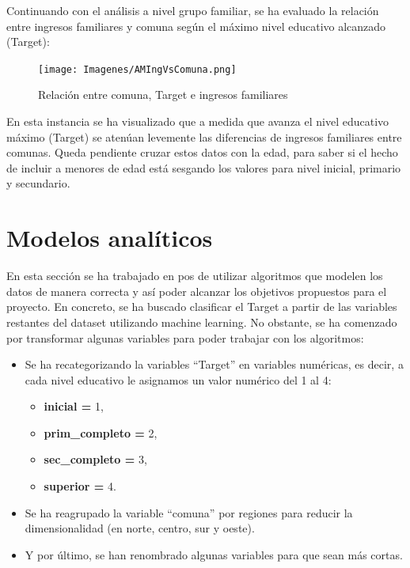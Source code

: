 \documentclass[a4paper]{article}
\begin{document}
        \newpage

        Continuando con el análisis a nivel grupo familiar, se ha evaluado la relación entre ingresos familiares y comuna según el máximo nivel educativo alcanzado (Target):
        \begin{figure}[H]
            \centering
            \texttt{[image: Imagenes/AMIngVsComuna.png]}
            \caption{Relación entre comuna, Target e ingresos familiares}
            \label{AM Location, Taget and Familiar Income}
        \end{figure}
 
        En esta instancia se ha visualizado que a medida que avanza el nivel educativo máximo (Target) se atenúan levemente las diferencias de ingresos familiares entre comunas. Queda pendiente cruzar estos datos con la edad, para saber si el hecho de incluir a menores de edad está sesgando los valores para nivel inicial, primario y secundario.
 
\newpage


\section{Modelos analíticos}

    En esta sección se ha trabajado en pos de utilizar algoritmos que modelen los datos de manera correcta y así poder alcanzar los objetivos propuestos para el proyecto. En concreto, se ha buscado clasificar el Target a partir de las variables restantes del dataset utilizando machine learning. 
    No obstante, se ha comenzado por transformar algunas variables para poder trabajar con los algoritmos:
    \begin{itemize}
        \item Se ha recategorizando la variables ``Target'' en variables numéricas, es decir, a cada nivel educativo le asignamos un valor numérico del 1 al 4:
        \begin{itemize}
            \item \textbf{inicial =} 1,
            \item \textbf{prim\_completo =} 2,
            \item \textbf{sec\_completo =} 3,
            \item \textbf{superior =} 4.
        \end{itemize}
        \item Se ha reagrupado la variable ``comuna'' por regiones para reducir la dimensionalidad (en norte, centro, sur y oeste).
        \item Y por último, se han renombrado algunas variables para que sean más cortas.
    \end{itemize}
\end{document}
